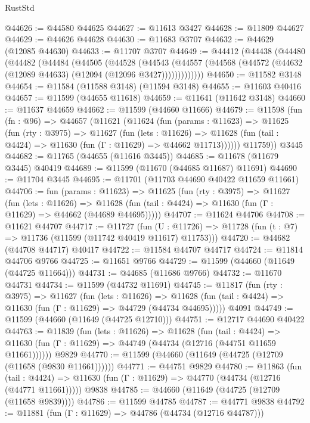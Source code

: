 \begin{lexlean}{RustStd}
\begin{coremodule}
@44626 := @44580 @44625
@44627 := @11613 @3427
@44628 := @11809 @44627
@44629 := @44626 @44628
@44630 := @11683 @3707
@44632 := @44629 (@12085 @44630)
@44633 := @11707 @3707
@44649 := @44412
    (@44438
      (@44480
        (@44482
          (@44484
            (@44505
              (@44528
                (@44543
                  (@44557 (@44568 (@44572 (@44632 (@12089 @44633) (@12094 (@12096 @3427)))))))))))))
@44650 := @11582 @3148
@44654 := @11584 (@11588 @3148) (@11594 @3148)
@44655 := @11603 @40416
@44657 := @11599 (@44655 @11618)
@44659 := @11641 (@11642 @3148)
@44660 := @11637 @44659
@44662 := @11599 (@44660 @11666)
@44679 := @11598
    (fun (fn : @96) =>
    @44657
      (@11621
        (@11624
          (fun (params : @11623) =>
          @11625
            (fun (rty : @3975) =>
            @11627
              (fun (lets : @11626) =>
              @11628 (fun (tail : @4424) => @11630 (fun (Γ : @11629) => @44662 @11713))))))
        @11759))
    @3445
@44682 := @11765 (@44655 (@11616 @3445))
@44685 := @11678 (@11679 @3445) @40419
@44689 := @11599 (@11670 (@44685 @11687) @11691)
@44690 := @11704 @3445
@44695 := @11701 (@11703 @44690 @40422 @11659 @11661)
@44706 := fun (params : @11623) =>
  @11625
    (fun (rty : @3975) =>
    @11627
      (fun (lets : @11626) =>
      @11628 (fun (tail : @4424) => @11630 (fun (Γ : @11629) => @44662 (@44689 @44695)))))
@44707 := @11624 @44706
@44708 := @11621 @44707
@44717 := @11727
    (fun (U : @11726) => @11728 (fun (t : @7) => @11736 (@11599 (@11742 @40419 @11617) @11753)))
@44720 := @44682 (@44708 @44717) @40417
@44722 := @11584 @44707 @44717
@44724 := @11814 @44706 @9766
@44725 := @11651 @9766
@44729 := @11599 (@44660 (@11649 (@44725 @11664)))
@44731 := @44685 (@11686 @9766)
@44732 := @11670 @44731
@44734 := @11599 (@44732 @11691)
@44745 := @11817
    (fun (rty : @3975) =>
    @11627
      (fun (lets : @11626) =>
      @11628 (fun (tail : @4424) => @11630 (fun (Γ : @11629) => @44729 (@44734 @44695)))))
    @4091
@44749 := @11599 (@44660 (@11649 (@44725 @12710)))
@44751 := @12717 @44690 @40422
@44763 := @11839
    (fun (lets : @11626) =>
    @11628
      (fun (tail : @4424) =>
      @11630 (fun (Γ : @11629) => @44749 (@44734 (@12716 (@44751 @11659 @11661))))))
    @9829
@44770 := @11599 (@44660 (@11649 (@44725 (@12709 (@11658 (@9830 @11661))))))
@44771 := @44751 @9829
@44780 := @11863
    (fun (tail : @4424) => @11630 (fun (Γ : @11629) => @44770 (@44734 (@12716 (@44771 @11661)))))
    @9838
@44785 := @44660 (@11649 (@44725 (@12709 (@11658 @9839))))
@44786 := @11599 @44785
@44787 := @44771 @9838
@44792 := @11881 (fun (Γ : @11629) => @44786 (@44734 (@12716 @44787)))

\end{coremodule}
\end{lexlean}
